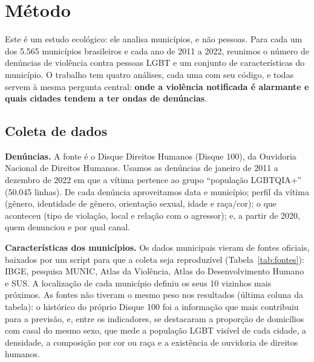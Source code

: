 \documentclass[12pt]{article}
\begin{document}
\section{Método}

Este é um estudo ecológico: ele analisa municípios, e não pessoas. Para cada um dos 5.565 municípios brasileiros e cada ano de 2011 a 2022, reunimos o número de denúncias de violência contra pessoas LGBT e um conjunto de características do município. O trabalho tem quatro análises, cada uma com seu código, e todas servem à mesma pergunta central: \textbf{onde a violência notificada é alarmante e quais cidades tendem a ter ondas de denúncias}.

\subsection{Coleta de dados}

\textbf{Denúncias.} A fonte é o Disque Direitos Humanos (Disque 100), da Ouvidoria Nacional de Direitos Humanos. Usamos as denúncias de janeiro de 2011 a dezembro de 2022 em que a vítima pertence ao grupo ``população LGBTQIA+'' (50.045 linhas). De cada denúncia aproveitamos data e município; perfil da vítima (gênero, identidade de gênero, orientação sexual, idade e raça/cor); o que aconteceu (tipo de violação, local e relação com o agressor); e, a partir de 2020, quem denunciou e por qual canal.

\textbf{Características dos municípios.} Os dados municipais vieram de fontes oficiais, baixados por um script para que a coleta seja reproduzível (Tabela~\ref{tab:fontes}): IBGE, pesquisa MUNIC, Atlas da Violência, Atlas do Desenvolvimento Humano e SUS. A localização de cada município definiu os seus 10 vizinhos mais próximos. As fontes não tiveram o mesmo peso nos resultados (última coluna da tabela): o histórico do próprio Disque 100 foi a informação que mais contribuiu para a previsão, e, entre os indicadores, se destacaram a proporção de domicílios com casal do mesmo sexo, que mede a população LGBT visível de cada cidade, a densidade, a composição por cor ou raça e a existência de ouvidoria de direitos humanos.
\end{document}
